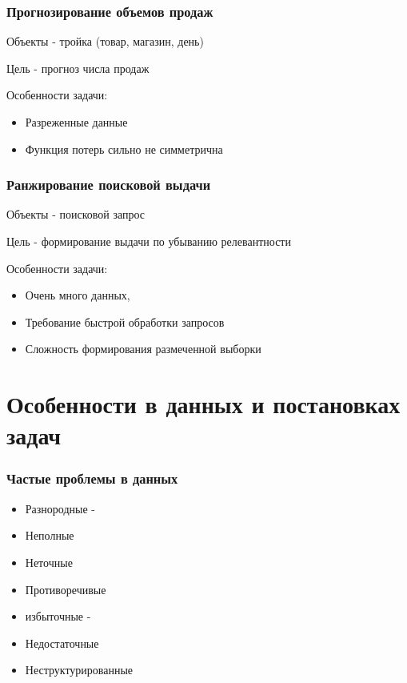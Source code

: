 \documentclass{beamer}
\begin{document}
	\begin{frame}
		\frametitle{Прогнозирование объемов продаж}
		Объекты - тройка (товар, магазин, день)
		
		Цель - прогноз числа продаж
		
		\vspace{15}
		
		Особенности задачи:
		\begin{itemize}
			\item Разреженные данные
			\item Функция потерь сильно не симметрична
		\end{itemize}	
	\end{frame}
	
	
	\begin{frame}
		\frametitle{Ранжирование поисковой выдачи}
		Объекты - поисковой запрос
		
		Цель - формирование выдачи по убыванию релевантности
		
		\vspace{15}
				
		Особенности задачи:
		\begin{itemize}
			\item Очень много данных, 
			\item Требование быстрой обработки запросов
			\item Сложность формирования размеченной выборки
		\end{itemize}	
	\end{frame}
	

	\section{Особенности в данных и постановках задач}
	\begin{frame}
		\frametitle{Частые проблемы в данных}
		\begin{itemize}
			\item Разнородные - 
			\item Неполные
			\item Неточные
			\item Противоречивые
			\item избыточные - 
			\item Недостаточные 
			\item Неструктурированные
		\end{itemize}
	\end{frame}
	
	
\end{document}
